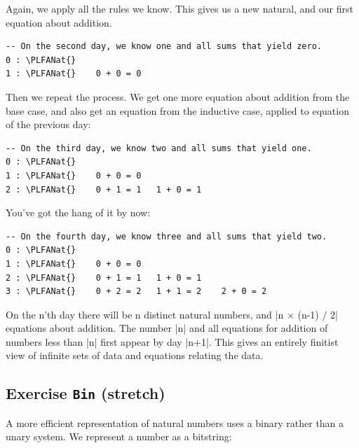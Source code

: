\documentclass{memoir}
\newcommand{\PLFANat}{\ensuremath{\mathbb{N}}}
\newcommand{\PLFASymbol}[1]{{\PLFASymbolFont #1}}
\begin{document}
\par
Again, we apply all the rules we know. This gives us a new natural, and our
first equation about addition.

\par
\begin{verbatim}
-- On the second day, we know one and all sums that yield zero.
0 : \PLFANat{}
1 : \PLFANat{}    0 + 0 = 0
\end{verbatim}

\par
Then we repeat the process. We get one more equation about addition from the
base case, and also get an equation from the inductive case, applied to
equation of the previous day:

\par
\begin{verbatim}
-- On the third day, we know two and all sums that yield one.
0 : \PLFANat{}
1 : \PLFANat{}    0 + 0 = 0
2 : \PLFANat{}    0 + 1 = 1   1 + 0 = 1
\end{verbatim}

\par
\par\noindent You've got the hang of it by now:

\par
\begin{verbatim}
-- On the fourth day, we know three and all sums that yield two.
0 : \PLFANat{}
1 : \PLFANat{}    0 + 0 = 0
2 : \PLFANat{}    0 + 1 = 1   1 + 0 = 1
3 : \PLFANat{}    0 + 2 = 2   1 + 1 = 2    2 + 0 = 2
\end{verbatim}

\par
On the n'th day there will be n distinct natural numbers, and \LeanVerb|n \PLFASymbol{×} (n-1) / 2|
equations about addition. The number \LeanVerb|n| and all equations for addition of
numbers less than \LeanVerb|n| first appear by day \LeanVerb|n+1|. This gives an entirely
finitist view of infinite sets of data and equations relating the data.

\par

\subsection{Exercise \texttt{Bin} (stretch)}\label{PLFA--in--Lean----Part--1----Naturals----Exercise----Bin-----005FLPAR-005Fstretch-005FRPAR-005F}

\par
A more efficient representation of natural numbers uses a binary rather than a
unary system. We represent a number as a bitstring:
\end{document}
